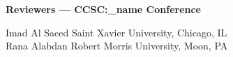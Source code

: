 \documentclass{article}
\begin{document}
\begingroup
  \centering
  \textbf{\large Reviewers --- CCSC:\conf_name Conference}\\
\endgroup

\vspace{10pt}

{\parindent0pt
Imad Al Saeed \dotfill Saint Xavier University, Chicago, IL\\
Rana Alabdan \dotfill Robert Morris University, Moon, PA\\
}
\end{document}
